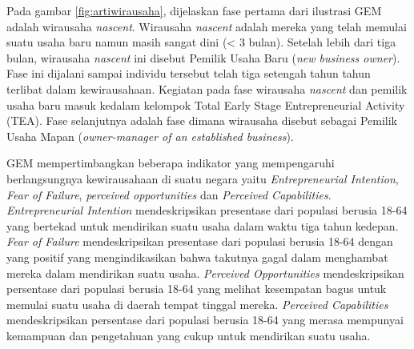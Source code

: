 Pada gambar \ref{fig:artiwirausaha}, dijelaskan fase pertama dari ilustrasi GEM adalah wirausaha \textit{nascent}. Wirausaha \textit{nascent} adalah mereka yang telah memulai suatu usaha baru namun masih sangat dini (< 3 bulan). Setelah lebih dari tiga bulan, wirausaha \textit{nascent} ini disebut Pemilik Usaha Baru (\textit{new business owner}). Fase ini dijalani sampai individu tersebut telah tiga setengah tahun tahun terlibat dalam kewirausahaan. Kegiatan pada fase wirausaha \textit{nascent} dan pemilik usaha baru masuk kedalam kelompok Total Early Stage Entrepreneurial Activity (TEA). Fase selanjutnya adalah fase dimana wirausaha disebut sebagai Pemilik Usaha Mapan (\textit{owner-manager of an established business}). 

GEM mempertimbangkan beberapa indikator yang mempengaruhi berlangsungnya kewirausahaan di suatu negara yaitu \textit{Entrepreneurial Intention}, \textit{Fear of Failure}, \textit{perceived opportunities} dan \textit{Perceived Capabilities}. \textit{Entrepreneurial Intention} mendeskripsikan presentase dari populasi berusia 18-64 yang bertekad untuk mendirikan suatu usaha dalam waktu tiga tahun kedepan. \textit{Fear of Failure} mendeskripsikan presentase dari populasi berusia 18-64 dengan  yang positif yang mengindikasikan bahwa takutnya gagal dalam menghambat mereka dalam mendirikan suatu usaha. \textit{Perceived Opportunities} mendeskripsikan persentase dari populasi berusia 18-64 yang melihat kesempatan bagus untuk memulai suatu usaha di daerah tempat tinggal mereka. \textit{Perceived Capabilities} mendeskripsikan persentase dari populasi berusia 18-64 yang merasa mempunyai kemampuan dan pengetahuan yang cukup untuk mendirikan suatu usaha.



 
